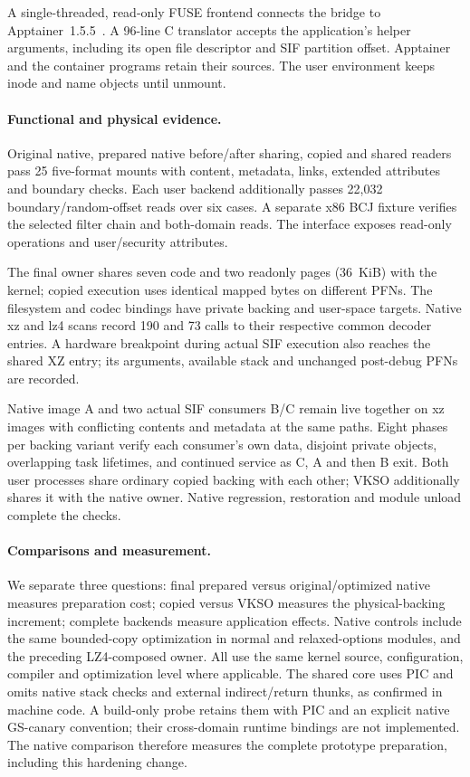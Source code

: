A single-threaded, read-only FUSE frontend connects the bridge to
Apptainer~1.5.5~\cite{ev_apptainer155}. A 96-line C translator accepts the
application's helper arguments, including its open file descriptor and SIF
partition offset. Apptainer and the container programs retain their sources.
The user environment keeps inode and name objects until unmount.

\paragraph{Functional and physical evidence.}
Original native, prepared native before/after sharing, copied and shared
readers pass 25 five-format mounts with content, metadata, links, extended
attributes and boundary checks. Each user backend additionally passes
22,032 boundary/random-offset reads over six cases. A separate x86 BCJ
fixture verifies the selected filter chain and both-domain reads.
The interface exposes read-only operations and user/security attributes.

The final owner shares seven code and two readonly pages (36~KiB) with
the kernel; copied execution uses identical mapped bytes on different PFNs.
The filesystem and codec bindings have private backing and user-space
targets. Native xz and lz4 scans record 190 and 73 calls to their respective
common decoder entries. A hardware breakpoint during actual SIF execution
also reaches the shared XZ entry; its arguments, available stack and
unchanged post-debug PFNs are recorded.

Native image A and two actual SIF consumers B/C remain live together on xz
images with conflicting contents and metadata at the same paths. Eight
phases per backing variant verify each consumer's own data, disjoint private
objects, overlapping task lifetimes, and continued service as C, A and then B
exit. Both user processes share ordinary copied backing with each other;
VKSO additionally shares it with the native owner. Native regression,
restoration and module unload complete the checks.

\paragraph{Comparisons and measurement.}
We separate three questions: final prepared versus original/optimized native
measures preparation cost; copied versus VKSO measures the physical-backing
increment; complete backends measure application effects. Native controls
include the same bounded-copy optimization in normal and relaxed-options
modules, and the preceding LZ4-composed owner. All use the same kernel
source, configuration, compiler and optimization level where applicable.
The shared core uses PIC and omits native stack checks and external
indirect/return thunks, as confirmed in machine code. A build-only probe
retains them with PIC and an explicit native GS-canary convention; their
cross-domain runtime bindings are not implemented. The native comparison
therefore measures the complete prototype preparation, including this
hardening change.

